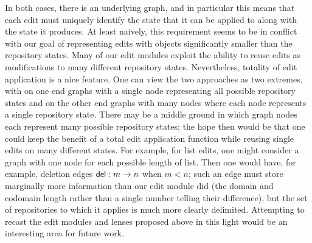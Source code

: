 In both cases, there is an underlying graph, and in particular this means
that each edit must uniquely identify the state that it can be applied to
along with the state it produces. At least naively, this requirement seems
to be in conflict with our goal of representing edits with objects
significantly smaller than the repository states. Many of our edit modules
exploit the ability to reuse edits as modifications to many different
repository states. Nevertheless, totality of edit application is a nice
feature. One can view the two approaches as two extremes, with on one end
graphs with a single node representing all possible repository states and on
the other end graphs with many nodes where each node represents a single
repository state. There may be a middle ground in which graph nodes each
represent many possible repository states; the hope then would be that one
could keep the benefit of a total edit application function while reusing
single edits on many different states. For example, for list edits, one
might consider a graph with one node for each possible length of list. Then
one would have, for example, deletion edges $\mathsf{del} : m \to n$ when
$m<n$; such an edge must store marginally more information than our edit
module did (the domain and codomain length rather than a single number telling
their difference), but the set of repositories to which it applies is much
more clearly delimited. Attempting to recast the edit modules and lenses
proposed above in this light would be an interesting area for future work.

